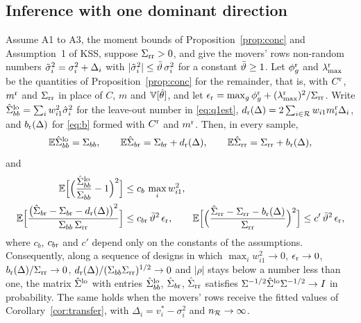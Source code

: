 \subsection{Inference with one dominant direction}
\begin{proposition}[The covariance matrix for $q=1$]\label{prop:q1}
Assume A1 to A3, the moment bounds of Proposition~\ref{prop:conc} and Assumption~1 of KSS, suppose
$\Sigma_{\rm rr}>0$, and give the movers' rows non-random numbers $\tilde\sigma_i^2=\sigma_i^2+\Delta_i$ with
$|\tilde\sigma_i^2|\le\bar\vartheta\,\sigma_i^2$ for a constant $\bar\vartheta\ge1$. Let
$\phi_g^{\rm r}$ and $\lambda_{\max}^{\rm r}$ be the quantities of Proposition~\ref{prop:conc} for the remainder,
that is, with $C^{\rm r}$, $m^{\rm r}$ and $\Sigma_{\rm rr}$ in place of $C$, $m$ and $\mathbb{V}[\hat\theta]$, and let
$\epsilon_{\rm r}=\max_g\phi_g^{\rm r}+(\lambda_{\max}^{\rm r})^2/\Sigma_{\rm rr}$. Write
$\hat\Sigma_{bb}^{\rm lo}=\sum_iw_{i1}^2\hat\sigma_i^2$ for the leave-out number in \eqref{eq:q1est},
$d_{\rm r}(\Delta)=2\sum_{i\in\mathcal{R}}w_{i1}m_i^{\rm r}\Delta_i$, and $b_{\rm r}(\Delta)$ for \eqref{eq:b} formed with
$C^{\rm r}$ and $m^{\rm r}$. Then, in every sample,
\[
\mathbb{E}\hat\Sigma_{bb}^{\rm lo}=\Sigma_{bb},\qquad \mathbb{E}\hat\Sigma_{b{\rm r}}=\Sigma_{b{\rm r}}+d_{\rm r}(\Delta),\qquad
\mathbb{E}\hat\Sigma_{\rm rr}=\Sigma_{\rm rr}+b_{\rm r}(\Delta),
\]
and
\begin{align*}
\mathbb{E}\Big[\Big(\frac{\hat\Sigma_{bb}^{\rm lo}}{\Sigma_{bb}}-1\Big)^2\Big]&\le c_b\,\max_iw_{i1}^2,\\
\mathbb{E}\Big[\frac{\big(\hat\Sigma_{b{\rm r}}-\Sigma_{b{\rm r}}-d_{\rm r}(\Delta)\big)^2}{\Sigma_{bb}\,\Sigma_{\rm rr}}\Big]&\le c_{b{\rm r}}\,\bar\vartheta^2\,\epsilon_{\rm r},\qquad
\mathbb{E}\Big[\Big(\frac{\hat\Sigma_{\rm rr}-\Sigma_{\rm rr}-b_{\rm r}(\Delta)}{\Sigma_{\rm rr}}\Big)^2\Big]\le c'\,\bar\vartheta^2\,\epsilon_{\rm r},
\end{align*}
where $c_b$, $c_{b{\rm r}}$ and $c'$ depend only on the constants of the assumptions. Consequently, along a
sequence of designs in which $\max_iw_{i1}^2\to0$, $\epsilon_{\rm r}\to0$, $b_{\rm r}(\Delta)/\Sigma_{\rm rr}\to0$,
$d_{\rm r}(\Delta)/(\Sigma_{bb}\Sigma_{\rm rr})^{1/2}\to0$ and $|\rho|$ stays below a number less than one, the matrix
$\hat\Sigma^{\rm lo}$ with entries $\hat\Sigma_{bb}^{\rm lo}$, $\hat\Sigma_{b{\rm r}}$, $\hat\Sigma_{\rm rr}$ satisfies
$\Sigma^{-1/2}\hat\Sigma^{\rm lo}\Sigma^{-1/2}\to I$ in probability. The same holds when the movers' rows receive
the fitted values of Corollary~\ref{cor:transfer}, with $\Delta_i=v_i^*-\sigma_i^2$ and $n_{\mathcal{R}}\to\infty$.
\end{proposition}

